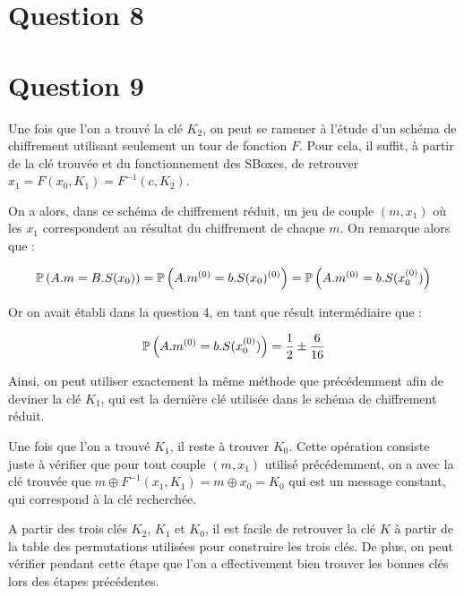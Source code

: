 \section*{Question 8}


\section*{Question 9}

Une fois que l'on a trouvé la clé $K_2$, on peut se ramener à l'étude d'un schéma de chiffrement utilisant seulement un tour de fonction $F$. Pour cela, il suffit, à partir de la clé trouvée et du fonctionnement des SBoxes, de retrouver $x_1 = F(x_0,K_1) = F^{-1}(c,K_2)$.

On a alors, dans ce schéma de chiffrement réduit, un jeu de couple $(m,x_1)$ où les $x_1$ correspondent au résultat du chiffrement de chaque $m$. On remarque alors que :

$$ \mathbb{P}\left( A.m = B.S(x_0) \right) = \mathbb{P}\left( A.m^{(0)} = b.S(x_0)^{(0)} \right) = \mathbb{P}\left( A.m^{(0)} = b.S(x_0^{(0)}) \right) $$

Or on avait établi dans la question 4, en tant que résult intermédiaire que :

$$ \mathbb{P}\left( A.m^{(0)} = b.S(x_0^{(0)}) \right) = \frac{1}{2} \pm \frac{6}{16}$$

Ainsi, on peut utiliser exactement la même méthode que précédemment afin de deviner la clé $K_1$, qui est la dernière clé utilisée dans le schéma de chiffrement réduit.

Une fois que l'on a trouvé $K_1$, il reste à trouver $K_0$. Cette opération consiste juste à vérifier que pour tout couple $(m,x_1)$ utilisé précédemment, on a avec la clé trouvée que $m \oplus F^{-1}(x_1,K_1) = m \oplus x_0 = K_0$ qui est un message constant, qui correspond à la clé recherchée.

A partir des trois clés $K_2$, $K_1$ et $K_0$, il est facile de retrouver la clé $K$ à partir de la table des permutations utilisées pour construire les trois clés. De plus, on peut vérifier pendant cette étape que l'on a effectivement bien trouver les bonnes clés lors des étapes précédentes.




